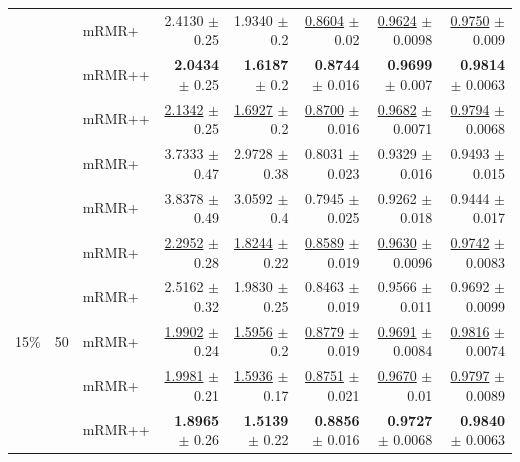 \begin{longtable}{llp{}rrrrr}
 &  & mRMR+ & 2.4130 {\scriptsize $\pm$ 0.25} & 1.9340 {\scriptsize $\pm$ 0.2} & \underline{0.8604} {\scriptsize $\pm$ 0.02} & \underline{0.9624} {\scriptsize $\pm$ 0.0098} & \underline{0.9750} {\scriptsize $\pm$ 0.009} \\
 &  & mRMR++ & \textbf{2.0434} {\scriptsize $\pm$ 0.25} & \textbf{1.6187} {\scriptsize $\pm$ 0.2} & \textbf{0.8744} {\scriptsize $\pm$ 0.016} & \textbf{0.9699} {\scriptsize $\pm$ 0.007} & \textbf{0.9814} {\scriptsize $\pm$ 0.0063} \\
 &  & mRMR++ & \underline{2.1342} {\scriptsize $\pm$ 0.25} & \underline{1.6927} {\scriptsize $\pm$ 0.2} & \underline{0.8700} {\scriptsize $\pm$ 0.016} & \underline{0.9682} {\scriptsize $\pm$ 0.0071} & \underline{0.9794} {\scriptsize $\pm$ 0.0068} \\
 &  & mRMR+ & 3.7333 {\scriptsize $\pm$ 0.47} & 2.9728 {\scriptsize $\pm$ 0.38} & 0.8031 {\scriptsize $\pm$ 0.023} & 0.9329 {\scriptsize $\pm$ 0.016} & 0.9493 {\scriptsize $\pm$ 0.015} \\
 &  & mRMR+ & 3.8378 {\scriptsize $\pm$ 0.49} & 3.0592 {\scriptsize $\pm$ 0.4} & 0.7945 {\scriptsize $\pm$ 0.025} & 0.9262 {\scriptsize $\pm$ 0.018} & 0.9444 {\scriptsize $\pm$ 0.017} \\
 &  & mRMR+ & \underline{2.2952} {\scriptsize $\pm$ 0.28} & \underline{1.8244} {\scriptsize $\pm$ 0.22} & \underline{0.8589} {\scriptsize $\pm$ 0.019} & \underline{0.9630} {\scriptsize $\pm$ 0.0096} & \underline{0.9742} {\scriptsize $\pm$ 0.0083} \\
 &  & mRMR+ & 2.5162 {\scriptsize $\pm$ 0.32} & 1.9830 {\scriptsize $\pm$ 0.25} & 0.8463 {\scriptsize $\pm$ 0.019} & 0.9566 {\scriptsize $\pm$ 0.011} & 0.9692 {\scriptsize $\pm$ 0.0099} \\
\midrule
15\% & 50 & mRMR+ & \underline{1.9902} {\scriptsize $\pm$ 0.24} & \underline{1.5956} {\scriptsize $\pm$ 0.2} & \underline{0.8779} {\scriptsize $\pm$ 0.019} & \underline{0.9691} {\scriptsize $\pm$ 0.0084} & \underline{0.9816} {\scriptsize $\pm$ 0.0074} \\
 &  & mRMR+ & \underline{1.9981} {\scriptsize $\pm$ 0.21} & \underline{1.5936} {\scriptsize $\pm$ 0.17} & \underline{0.8751} {\scriptsize $\pm$ 0.021} & \underline{0.9670} {\scriptsize $\pm$ 0.01} & \underline{0.9797} {\scriptsize $\pm$ 0.0089} \\
 &  & mRMR++ & \textbf{1.8965} {\scriptsize $\pm$ 0.26} & \textbf{1.5139} {\scriptsize $\pm$ 0.22} & \textbf{0.8856} {\scriptsize $\pm$ 0.016} & \textbf{0.9727} {\scriptsize $\pm$ 0.0068} & \textbf{0.9840} {\scriptsize $\pm$ 0.0063} \\

\end{longtable}
